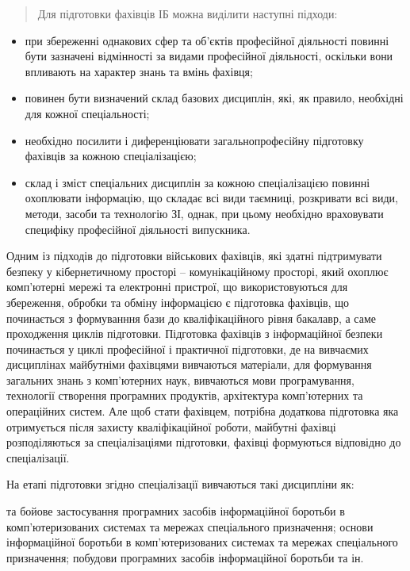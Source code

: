 \begin{quote}
Для підготовки фахівців ІБ можна виділити наступні підходи:
\end{quote}
\begin{itemize}
\item {} 
при збереженні однакових сфер та об'єктів професійної діяльності повинні бути зазначені відмінності за видами професійної діяльності, оскільки вони впливають на характер знань та вмінь фахівця;

\item {} 
повинен бути визначений склад базових дисциплін, які, як правило, необхідні для кожної спеціальності;

\item {} 
необхідно посилити і диференціювати загальнопрофесійну підготовку фахівців за кожною спеціалізацією;

\item {} 
склад і зміст спеціальних дисциплін за кожною спеціалізацією повинні охоплювати інформацію, що складає всі види таємниці, розкривати всі види, методи, засоби та технологію ЗІ, однак, при цьому необхідно враховувати специфіку професійної діяльності випускника.

\end{itemize}

Одним із підходів до підготовки військових фахівців, які здатні підтримувати безпеку у кібернетичному просторі – комунікаційному просторі, який охоплює комп’ютерні мережі та електронні пристрої, що використовуються для збереження, обробки та обміну інформацією є підготовка фахівців, що починається з формуванння бази до кваліфікаційного рівня бакалавр, а саме проходження циклів підготовки.
Підготовка фахівців з інформаційної безпеки 
починається у циклі професійної і практичної підготовки, де на вивчаємих дисциплінах майбутніми фахівцями вивчаються матеріали, для формування загальних знань з комп’ютерних наук, вивчаються мови програмування, технології створення програмних продуктів, архітектура комп’ютерних та операційних  систем. Але щоб стати фахівцем, потрібна додаткова підготовка яка отримується після захисту кваліфікаційної роботи, майбутні фахівці розподіляються за спеціалізаціями підготовки, фахівці формуються відповідно до спеціалізації.

На етапі підготовки згідно спеціалізації вивчаються такі дисципліни як:
\begin{itemize}
 та бойове застосування програмних засобів інформаційної боротьби в комп’ютеризованих системах та мережах спеціального призначення;
 основи інформаційної боротьби в комп’ютеризованих системах та мережах спеціального призначення;
 побудови програмних засобів інформаційної боротьби та ін.
\end{itemize}


